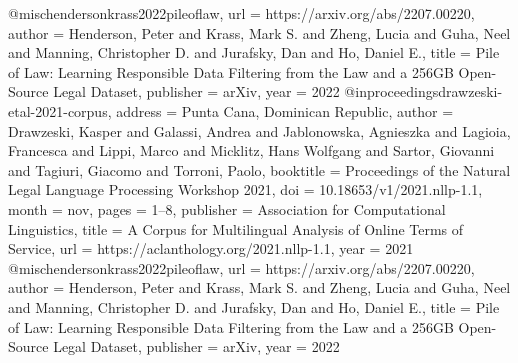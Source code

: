 \documentclass[11pt,a4paper]{article}
\begin{document}


@misc{hendersonkrass2022pileoflaw,
  url = {https://arxiv.org/abs/2207.00220},
  author = {Henderson, Peter and Krass, Mark S. and Zheng, Lucia and Guha, Neel and Manning, Christopher D. and Jurafsky, Dan and Ho, Daniel E.},
  title = {Pile of Law: Learning Responsible Data Filtering from the Law and a 256GB Open-Source Legal Dataset},
  publisher = {arXiv},
  year = {2022}
}
@inproceedings{drawzeski-etal-2021-corpus,
  address = {Punta Cana, Dominican Republic},
  author = {Drawzeski, Kasper and Galassi, Andrea and Jablonowska, Agnieszka and Lagioia, Francesca and Lippi, Marco and Micklitz, Hans Wolfgang and Sartor, Giovanni and Tagiuri, Giacomo and Torroni, Paolo},
  booktitle = {Proceedings of the Natural Legal Language Processing Workshop 2021},
  doi = {10.18653/v1/2021.nllp-1.1},
  month = {nov},
  pages = {1--8},
  publisher = {Association for Computational Linguistics},
  title = {{A Corpus for Multilingual Analysis of Online Terms of Service}},
  url = {https://aclanthology.org/2021.nllp-1.1},
  year = {2021}
}
@misc{hendersonkrass2022pileoflaw,
  url = {https://arxiv.org/abs/2207.00220},
  author = {Henderson, Peter and Krass, Mark S. and Zheng, Lucia and Guha, Neel and Manning, Christopher D. and Jurafsky, Dan and Ho, Daniel E.},
  title = {Pile of Law: Learning Responsible Data Filtering from the Law and a 256GB Open-Source Legal Dataset},
  publisher = {arXiv},
  year = {2022}
}
\end{document}
